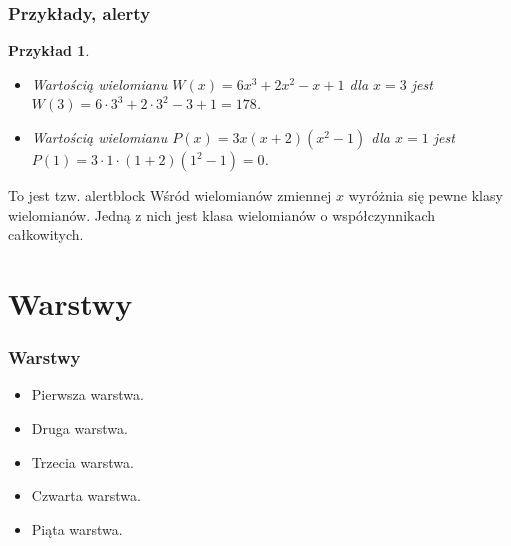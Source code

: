 \documentclass[10pt,xcolor={dvipsnames}]{beamer}
\newtheorem{przyklad}{Przykład}
\begin{document}
\begin{frame}
\frametitle{Przykłady, alerty}
\begin{przyklad}
\begin{itemize}
\item Wartością wielomianu $W(x) = 6x^3+2x^2-x+1$ dla $x=3$ jest $W(3) = 6\cdot 3^3+2\cdot 3^2-3+1 = 178$.
\item Wartością wielomianu $P(x) = 3x(x+2)(x^2-1)$ dla $x=1$ jest $P(1) = 3\cdot 1\cdot (1+2)(1^2-1)=0$.
\end{itemize}
\end{przyklad}

\begin{alertblock}{To jest tzw. alertblock}
Wśród wielomianów zmiennej $x$ wyróżnia się pewne klasy wielomianów. Jedną z nich jest klasa wielomianów o współczynnikach całkowitych.
\end{alertblock}
\end{frame}



\section{Warstwy}



\begin{frame}
\frametitle{Warstwy}
  \begin{itemize}
  \item<1-> Pierwsza warstwa.
  \item<2-> Druga warstwa.
  \item<3-> Trzecia warstwa.
  \item<4-> Czwarta warstwa.
  \item<5-> Piąta warstwa.
  \end{itemize}
\end{frame}
\end{document}
